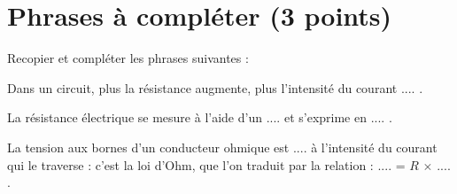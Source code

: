 \section{Phrases à compléter (3 points)}

Recopier et compléter les phrases suivantes :

\begin{questions}
	\question[\half] Dans un circuit, plus la résistance augmente, plus l'intensité du courant $....$ .
	
	\question[1] La résistance électrique se mesure à l'aide d'un $....$ et s'exprime en $....$ .
	
	\question[1\half] La tension aux bornes d'un conducteur ohmique est $....$ à l'intensité du courant qui le traverse : c'est la loi d'Ohm, que l'on traduit par la relation : $....$ = $R$ $\times$  $....$.
\end{questions}